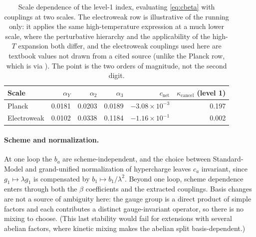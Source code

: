 \documentclass[11pt]{article}
\theoremstyle{definition}
\theoremstyle{remark}
\newcommand{\net}{c_{\mathrm{net}}}
\newcommand{\kcancel}{\kappa_{\mathrm{cancel}}}
\begin{document}
\begin{table}[t]
\centering
\small
\begin{tabular}{@{}l r r r r r@{}}
\toprule
Scale & $\alpha_Y$ & $\alpha_2$ & $\alpha_3$ & $\net$ & $\kcancel$ (level 1) \\
\midrule
Planck & 0.0181 & 0.0203 & 0.0189 & $-3.08\times 10^{-3}$ & 0.197 \\
Electroweak & 0.0102 & 0.0338 & 0.1184 & $-1.16\times 10^{-1}$ & 0.002 \\
\bottomrule
\end{tabular}
\caption{Scale dependence of the level-1 index, evaluating \eqref{eq:cbeta} with couplings at two
scales. The electroweak row is illustrative of the running only: it applies the same
high-temperature expression at a much lower scale, where the perturbative hierarchy and the
applicability of the high-$T$ expansion both differ, and the electroweak couplings used here are
textbook values not drawn from a cited source (unlike the Planck row, which is
\citet{Buttazzo2013} via \citet{TurokBoyle2023}). The point is the two orders of magnitude, not the
second digit.}
\label{tab:scale}
\end{table}

\paragraph{Scheme and normalization.} At one loop the $b_a$ are scheme-independent, and the choice
between Standard-Model and grand-unified normalization of hypercharge leaves $c_a$ invariant, since
$g_1 \mapsto \lambda g_1$ is compensated by $b_1 \mapsto b_1/\lambda^2$. Beyond one loop, scheme
dependence enters through both the $\beta$ coefficients and the extracted couplings. Basis changes
are not a source of ambiguity here: the gauge group is a direct product of simple factors and each
contributes a distinct gauge-invariant operator, so there is no mixing to choose. (This last
stability would fail for extensions with several abelian factors, where kinetic mixing makes the
abelian split basis-dependent.)
\end{document}
